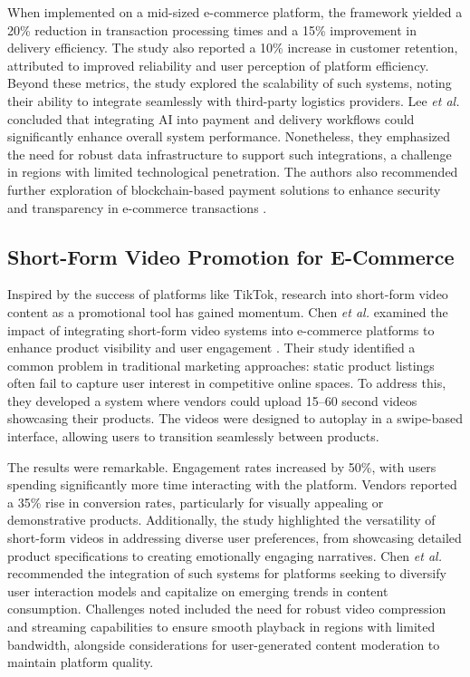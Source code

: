 \documentclass[12pt]{report}
\begin{document}
When implemented on a mid-sized e-commerce platform, the framework yielded a 20\%
reduction in transaction processing times and a 15\% improvement in delivery efficiency. The
study also reported a 10\% increase in customer retention, attributed to improved reliability
and user perception of platform efficiency. Beyond these metrics, the study explored the
scalability of such systems, noting their ability to integrate seamlessly with third-party
logistics providers. Lee \textit{et al.} concluded that integrating AI into payment and delivery
workflows could significantly enhance overall system performance. Nonetheless, they
emphasized the need for robust data infrastructure to support such integrations, a challenge in
regions with limited technological penetration. The authors also recommended further
exploration of blockchain-based payment solutions to enhance security and transparency in
e-commerce transactions \cite{c18}.

\subsection*{Short-Form Video Promotion for E-Commerce}

Inspired by the success of platforms like TikTok, research into short-form video content as a
promotional tool has gained momentum. Chen \textit{et al.} examined the impact of integrating
short-form video systems into e-commerce platforms to enhance product visibility and user
engagement \cite{c19}. Their study identified a common problem in traditional marketing
approaches: static product listings often fail to capture user interest in competitive online
spaces. To address this, they developed a system where vendors could upload 15–60 second
videos showcasing their products. The videos were designed to autoplay in a swipe-based
interface, allowing users to transition seamlessly between products.

The results were remarkable. Engagement rates increased by 50\%, with users spending
significantly more time interacting with the platform. Vendors reported a 35\% rise in
conversion rates, particularly for visually appealing or demonstrative products. Additionally,
the study highlighted the versatility of short-form videos in addressing diverse user
preferences, from showcasing detailed product specifications to creating emotionally
engaging narratives. Chen \textit{et al.} recommended the integration of such systems for platforms
seeking to diversify user interaction models and capitalize on emerging trends in content
consumption. Challenges noted included the need for robust video compression and
streaming capabilities to ensure smooth playback in regions with limited bandwidth,
alongside considerations for user-generated content moderation to maintain platform quality\cite{c19}.
\end{document}

